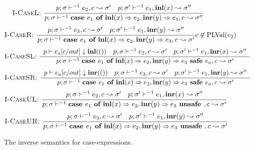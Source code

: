\begin{figure}[ht!]
\begin{align*}
\textsc{I-CaseL: }
  \dfrac
    {\begin{array}{cc}
       p;\sigma\vdash^{-1} e_2, c \leadsto \sigma' &
       p; \sigma' \vdash^{-1} e_1, \textbf{inl}(x) \leadsto \sigma''
     \end{array}}
    {p;\sigma\vdash^{-1} \textbf{case } e_1 \textbf{ of } \textbf{inl}(x) \Rightarrow e_2, \textbf{inr}(y) \Rightarrow e_3, c \leadsto \sigma''}
\end{align*}
\begin{align*}
\textsc{I-CaseR: }
  \dfrac
    {\begin{array}{cc}
       p;\sigma\vdash^{-1} e_3, c \leadsto \sigma' &
       p; \sigma' \vdash^{-1} e_1, \textbf{inr}(y) \leadsto \sigma''
     \end{array}}
    {p;\sigma\vdash^{-1} \textbf{case } e_1 \textbf{ of } \textbf{inl}(x) \Rightarrow e_2, \textbf{inr}(y) \Rightarrow e_3, c \leadsto \sigma'}
    c \not\in \text{PLVal} (e_2)
\end{align*}
\begin{align*}
\textsc{I-CaseSL: }
  \dfrac
    {\begin{array}{ccc}
        p \vdash e_a[c / out] \downarrow \textbf{inl}(()) &
        p;\sigma\vdash^{-1} e_2, c \leadsto \sigma' &
        p; \sigma' \vdash^{-1} e_1, \textbf{inr}(x) \leadsto \sigma''
     \end{array}}
    {p;\sigma\vdash^{-1} \textbf{case } e_1 \textbf{ of } \textbf{inl}(x) \Rightarrow e_2, \textbf{inr}(y) \Rightarrow e_3 \textbf{ safe } e_a, c \leadsto \sigma'}
\end{align*}
\begin{align*}
\textsc{I-CaseSR: }
  \dfrac
    {\begin{array}{ccc}
        p \vdash e_a[c / out] \downarrow \textbf{inr}(()) &
        p;\sigma\vdash^{-1} e_3, c \leadsto \sigma' &
        p; \sigma' \vdash^{-1} e_1, \textbf{inr}(y) \leadsto \sigma''
     \end{array}}
    {p;\sigma\vdash^{-1} \textbf{case } e_1 \textbf{ of } \textbf{inl}(x) \Rightarrow e_2, \textbf{inr}(y) \Rightarrow e_3 \textbf{ safe } e_a, c \leadsto \sigma'}
\end{align*}
\begin{align*}
\textsc{I-CaseUL: }
  \dfrac
    {\begin{array}{cc}
       p;\sigma\vdash^{-1} e_2, c \leadsto \sigma' &
       p; \sigma' \vdash^{-1} e_1, \textbf{inr}(x) \leadsto \sigma''
     \end{array}}
    {p;\sigma\vdash^{-1} \textbf{case } e_1 \textbf{ of } \textbf{inl}(x) \Rightarrow e_2, \textbf{inr}(y) \Rightarrow e_3 \textbf{ unsafe }, c \leadsto \sigma'}
\end{align*}
\begin{align*}
\textsc{I-CaseUR: }
  \dfrac
    {\begin{array}{cc}
       p;\sigma\vdash^{-1} e_3, c \leadsto \sigma' &
       p; \sigma' \vdash^{-1} e_1, \textbf{inr}(y) \leadsto \sigma''
     \end{array}}
    {p;\sigma\vdash^{-1} \textbf{case } e_1 \textbf{ of } \textbf{inl}(x) \Rightarrow e_2, \textbf{inr}(y) \Rightarrow e_3 \textbf{ unsafe }, c \leadsto \sigma'}
\end{align*}
\caption{The inverse semantics for case-expressions.}\label{fig:inverse_semantics_cases}
\end{figure}

